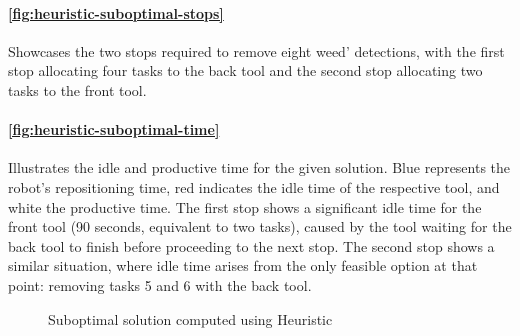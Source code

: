 \paragraph{\autoref{fig:heuristic-suboptimal-stops}} Showcases the two stops required to remove eight weed' detections, with the first stop allocating four tasks to the back tool and the second stop allocating two tasks to the front tool.

\paragraph{\autoref{fig:heuristic-suboptimal-time}} Illustrates the idle and productive time for the given solution. Blue represents the robot’s repositioning time, red indicates the idle time of the respective tool, and white the productive time. The first stop shows a significant idle time for the front tool (90 seconds, equivalent to two tasks), caused by the tool waiting for the back tool to finish before proceeding to the next stop. The second stop shows a similar situation, where idle time arises from the only feasible option at that point: removing tasks 5 and 6 with the back tool.

\begin{figure}[htb]
    \myfloatalign


    \caption{Suboptimal solution computed using Heuristic}
    \label{fig:heuristics-suboptimal}
\end{figure}

